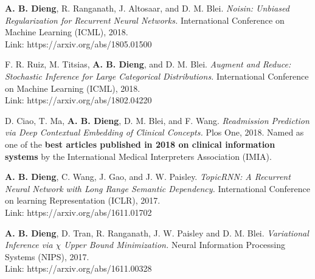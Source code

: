 \documentclass[letterpaper,200pt]{article}
\renewenvironment{itemize}{
  \begin{list}{}{
    \setlength{\leftmargin}{1.5em}
  }
}{
  \end{list}
}
\begin{document}
\begin{itemize}
	\item \textbf{A. B. Dieng}, R. Ranganath, J. Altosaar, and D. M. Blei. 
		\textit{Noisin: Unbiased Regularization for Recurrent Neural Networks.} 
		International Conference on Machine Learning (ICML), 2018.\\
		Link: https://arxiv.org/abs/1805.01500
	\item F. R. Ruiz, M. Titsias, \textbf{A. B. Dieng}, and D. M. Blei. 
		\textit{Augment and Reduce: Stochastic Inference for Large Categorical Distributions.} 
		International Conference on Machine Learning (ICML), 2018.\\
		Link: https://arxiv.org/abs/1802.04220
	\item D. Ciao, T. Ma, \textbf{A. B. Dieng}, D. M. Blei, and F. Wang. 
		\textit{Readmission Prediction via Deep Contextual Embedding of Clinical Concepts.} 
		Plos One, 2018. Named as one of the \textbf{best articles published in 2018 on clinical information systems} 
		by the International Medical Interpreters Association (IMIA).
	\item \textbf{A. B. Dieng}, C. Wang, J. Gao, and J. W. Paisley. 
		\textit{TopicRNN: A Recurrent Neural Network with Long Range Semantic Dependency.} 
		International Conference on learning Representation (ICLR), 2017.\\
		Link: https://arxiv.org/abs/1611.01702
	\item \textbf{A. B. Dieng}, D. Tran, R. Ranganath, J. W. Paisley and D. M. Blei. 
		\textit{Variational Inference via $\chi$ Upper Bound Minimization.} 
		Neural Information Processing Systems (NIPS), 2017. \\
		Link: https://arxiv.org/abs/1611.00328
\end{itemize}
\end{document}
